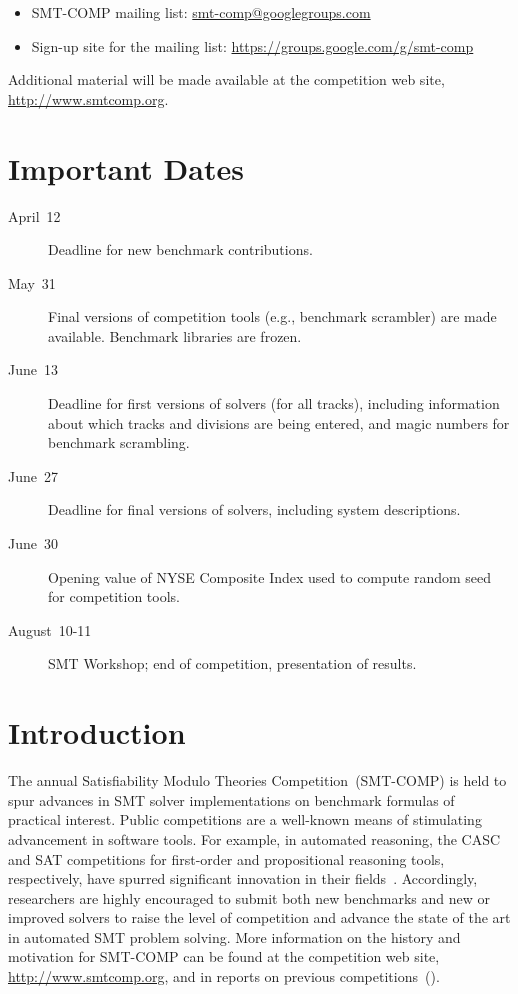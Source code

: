 \documentclass[12pt]{article}
\begin{document}
\begin{itemize}
\item SMT-COMP mailing list:
  \href{mailto:smt-comp@googlegroups.com}{\textrm{smt-comp@googlegroups.com}}
\item Sign-up site for the mailing list:
  \url{https://groups.google.com/g/smt-comp}
\end{itemize}

\noindent Additional material will be made available at the
competition web site, \url{http://www.smtcomp.org}.


\newpage

\section{Important Dates}
\label{sec:important}


\begin{description}
\item[April~12] Deadline for new benchmark contributions.
\item[May~31] Final versions of competition tools (e.g., benchmark
  scrambler) are made available.  Benchmark libraries are frozen.
\item[June~13] Deadline for first versions of solvers (for all tracks),
  including information about which tracks and divisions are being
  entered, and magic numbers for benchmark scrambling.
\item[June~27] Deadline for final versions of solvers, including
  system descriptions.
\item[June~30] Opening value of NYSE Composite Index used to compute
  random seed for competition tools.
\item[August~10-11] SMT Workshop; end of competition, presentation of
  results.
\end{description}


\section{Introduction}

The annual Satisfiability Modulo Theories Competition~(SMT-COMP) is
held to spur advances in SMT solver implementations on benchmark
formulas of practical interest.  Public competitions are a well-known
means of stimulating advancement in software tools.  For example, in
automated reasoning, the CASC and SAT competitions for first-order and
propositional reasoning tools, respectively, have spurred significant
innovation in their fields~\cite{leberre+03,PSS02}.
%
Accordingly, researchers are highly encouraged to submit both new
benchmarks and new or improved solvers to raise the level of
competition and advance the state of the art in automated SMT problem
solving. More information
on the history and motivation for SMT-COMP can be found at the
competition web site, \url{http://www.smtcomp.org}, and in reports on
previous
competitions~(\cite{SMTCOMP-JAR,SMTCOMP-FMSD,BDOS08,SMTCOMP-2008,CDW14,SMTCOMP-2012,CSW15}).
\end{document}
